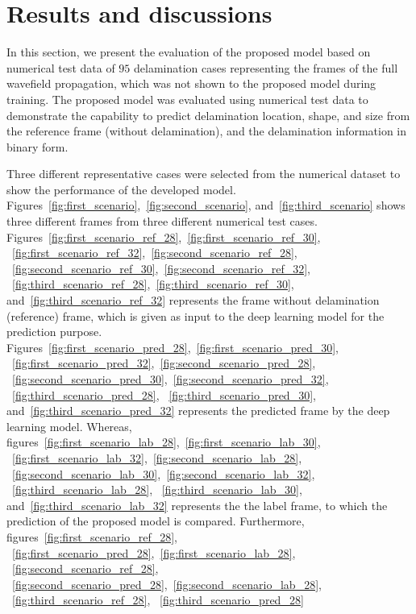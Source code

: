 \section{Results and discussions}
In this section, we present the evaluation of the proposed model based 
on numerical test data of \(95\) delamination cases representing the frames of 
the full wavefield propagation, which was not shown to the proposed model 
during training. 
The proposed model was evaluated using numerical test data to 
demonstrate the capability to predict delamination location, shape, and size 
from the reference frame (without delamination), and the delamination 
information in binary form.

Three different representative cases were selected from the numerical dataset 
to show the performance of the developed model.
Figures~\ref{fig:first_scenario},~\ref{fig:second_scenario}, 
and~\ref{fig:third_scenario} shows three different frames from three different 
numerical test cases.  
Figures~\ref{fig:first_scenario_ref_28},~\ref{fig:first_scenario_ref_30},
~\ref{fig:first_scenario_ref_32},~\ref{fig:second_scenario_ref_28},
~\ref{fig:second_scenario_ref_30},~\ref{fig:second_scenario_ref_32},
~\ref{fig:third_scenario_ref_28},~\ref{fig:third_scenario_ref_30}, 
and~\ref{fig:third_scenario_ref_32} represents the frame without delamination 
(reference) frame, which is given as input to the deep learning model for the 
prediction purpose. 
Figures~\ref{fig:first_scenario_pred_28},~\ref{fig:first_scenario_pred_30},
~\ref{fig:first_scenario_pred_32},~\ref{fig:second_scenario_pred_28},
~\ref{fig:second_scenario_pred_30},~\ref{fig:second_scenario_pred_32},
~\ref{fig:third_scenario_pred_28}, ~\ref{fig:third_scenario_pred_30}, 
and~\ref{fig:third_scenario_pred_32} represents the predicted frame by the deep 
learning model. 
Whereas, 
figures~\ref{fig:first_scenario_lab_28},~\ref{fig:first_scenario_lab_30},
~\ref{fig:first_scenario_lab_32},~\ref{fig:second_scenario_lab_28},
~\ref{fig:second_scenario_lab_30},~\ref{fig:second_scenario_lab_32},
~\ref{fig:third_scenario_lab_28}, ~\ref{fig:third_scenario_lab_30}, 
and~\ref{fig:third_scenario_lab_32} represents the the label frame, to which 
the prediction of the proposed model is compared.
Furthermore, figures~\ref{fig:first_scenario_ref_28}, 
~\ref{fig:first_scenario_pred_28},~\ref{fig:first_scenario_lab_28},
~\ref{fig:second_scenario_ref_28}, 
~\ref{fig:second_scenario_pred_28},~\ref{fig:second_scenario_lab_28},
~\ref{fig:third_scenario_ref_28}, ~\ref{fig:third_scenario_pred_28} 
